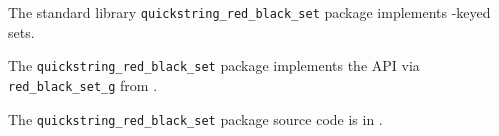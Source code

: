 
The standard library {\tt quickstring\_red\_black\_set} package implements 
-keyed sets.

The {\tt quickstring\_red\_black\_set} package implements the  API 
via {\tt red\_black\_set\_g} from 
.

The {\tt quickstring\_red\_black\_set} package source code is in .

